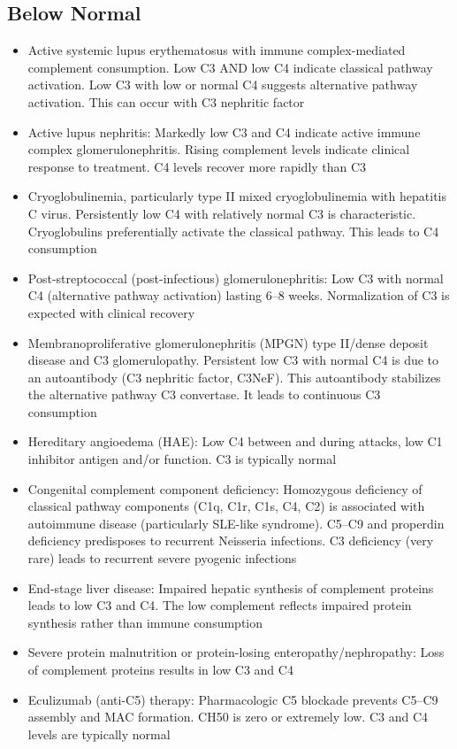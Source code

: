\subsection*{Below Normal}
\begin{itemize}
  \item Active systemic lupus erythematosus with immune complex-mediated complement consumption. Low C3 AND low C4 indicate classical pathway activation. Low C3 with low or normal C4 suggests alternative pathway activation. This can occur with C3 nephritic factor
  \item Active lupus nephritis: Markedly low C3 and C4 indicate active immune complex glomerulonephritis. Rising complement levels indicate clinical response to treatment. C4 levels recover more rapidly than C3
  \item Cryoglobulinemia, particularly type II mixed cryoglobulinemia with hepatitis C virus. Persistently low C4 with relatively normal C3 is characteristic. Cryoglobulins preferentially activate the classical pathway. This leads to C4 consumption
  \item Post-streptococcal (post-infectious) glomerulonephritis: Low C3 with normal C4 (alternative pathway activation) lasting 6--8 weeks. Normalization of C3 is expected with clinical recovery
  \item Membranoproliferative glomerulonephritis (MPGN) type II/dense deposit disease and C3 glomerulopathy. Persistent low C3 with normal C4 is due to an autoantibody (C3 nephritic factor, C3NeF). This autoantibody stabilizes the alternative pathway C3 convertase. It leads to continuous C3 consumption \cite{pickering2002uncontrolled}
  \item Hereditary angioedema (HAE): Low C4 between and during attacks, low C1 inhibitor antigen and/or function. C3 is typically normal
  \item Congenital complement component deficiency: Homozygous deficiency of classical pathway components (C1q, C1r, C1s, C4, C2) is associated with autoimmune disease (particularly SLE-like syndrome). C5--C9 and properdin deficiency predisposes to recurrent Neisseria infections. C3 deficiency (very rare) leads to recurrent severe pyogenic infections
  \item End-stage liver disease: Impaired hepatic synthesis of complement proteins leads to low C3 and C4. The low complement reflects impaired protein synthesis rather than immune consumption
  \item Severe protein malnutrition or protein-losing enteropathy/nephropathy: Loss of complement proteins results in low C3 and C4
  \item Eculizumab (anti-C5) therapy: Pharmacologic C5 blockade prevents C5--C9 assembly and MAC formation. CH50 is zero or extremely low. C3 and C4 levels are typically normal
\end{itemize}


